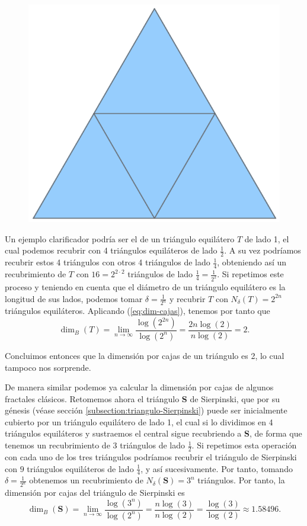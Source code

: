\begin{figure}
\includegraphics[scale=0.14, trim={0cm 0.35cm 0cm 0.5cm}, clip]{./img/triangulo-dividido.png}
\end{figure}
Un ejemplo clarificador podría ser el de un triángulo equilátero $T$ de lado 1, el cual podemos recubrir con 4 triángulos equiláteros de lado $\frac 1 2$. A su vez podríamos recubrir estos 4 triángulos con otros 4 triángulos de lado $\frac{1}{4}$, obteniendo así un recubrimiento de $T$ con $16=2^{2\cdot 2}$ triángulos de lado $\frac{1}{4}=\frac{1}{2^2}$. Si repetimos este proceso y teniendo en cuenta que el diámetro de un triángulo equilátero es la longitud de sus lados, podemos tomar $\delta=\frac{1}{2^n}$ y recubrir $T$ con $N_\delta(T)=2^{2n}$ triángulos equiláteros. Aplicando (\ref{eq:dim-cajas}), tenemos por tanto que
$$
\dim_B(T)=\lim_{n\rightarrow\infty}\dfrac{\log(2^{2n})}{\log(2^n)} = \dfrac{2n\log(2)}{n\log(2)}=2.
$$

Concluimos entonces que la dimensión por cajas de un triángulo es 2, lo cual tampoco nos sorprende.

De manera similar podemos ya calcular la dimensión por cajas de algunos fractales clásicos. Retomemos ahora el triángulo \textbf{S} de Sierpinski, que por su génesis (véase sección \ref{subsection:triangulo-Sierpinski}) puede ser inicialmente cubierto por un triángulo equilátero de lado 1, el cual si lo dividimos en 4 triángulos equiláteros y sustraemos el central sigue recubriendo a \textbf{S}, de forma que tenemos un recubrimiento de 3 triángulos de lado $\frac{1}{2}$. Si repetimos esta operación con cada uno de los tres triángulos podríamos recubrir el triángulo de Sierpinski con $9$ triángulos equiláteros de lado $\frac 1 4$, y así sucesivamente. Por tanto, tomando $\delta=\frac{1}{2^n}$ obtenemos un recubrimiento de $N_\delta(\mathbf{S})=3^n$ triángulos. Por tanto, la dimensión por cajas del triángulo de Sierpinski es 
$$
\dim_B(\mathbf{S})=\lim_{n\rightarrow\infty}\dfrac{\log(3^{n})}{\log(2^n)} = \dfrac{n\log(3)}{n\log(2)}=\dfrac{\log(3)}{\log(2)}\approx 1.58496.
$$

